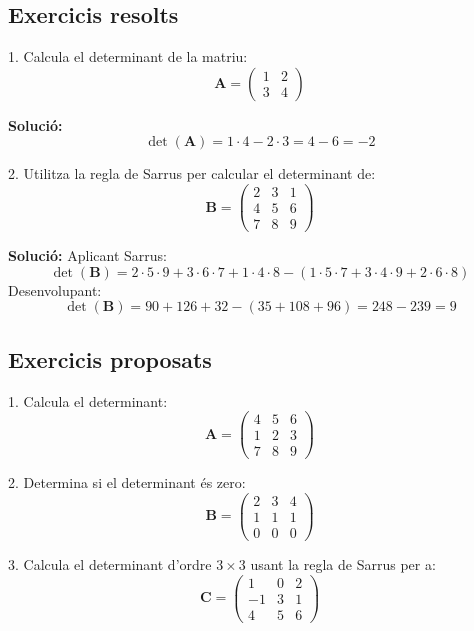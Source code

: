 \documentclass[12pt]{article}
\newcommand{\mat}[1]{\mathbf{#1}}
\begin{document}
\subsection*{Exercicis resolts}
\begin{exercici}
1. Calcula el determinant de la matriu:
\[
\mat{A} = \begin{pmatrix}
1 & 2 \\
3 & 4
\end{pmatrix}
\]

\textbf{Solució:}
\[
\det(\mat{A}) = 1\cdot4 - 2\cdot3 = 4 - 6 = -2
\]

2. Utilitza la regla de Sarrus per calcular el determinant de:
\[
\mat{B} = \begin{pmatrix}
2 & 3 & 1 \\
4 & 5 & 6 \\
7 & 8 & 9
\end{pmatrix}
\]

\textbf{Solució:} Aplicant Sarrus:
\[
\det(\mat{B}) = 2\cdot5\cdot9 + 3\cdot6\cdot7 + 1\cdot4\cdot8 
- (1\cdot5\cdot7 + 3\cdot4\cdot9 + 2\cdot6\cdot8)
\]
Desenvolupant:
\[
\det(\mat{B}) = 90 + 126 + 32 - (35 + 108 + 96) = 248 - 239 = 9
\]
\end{exercici}

\subsection*{Exercicis proposats}
\begin{exercici}
1. Calcula el determinant:
\[
\mat{A} = \begin{pmatrix}
4 & 5 & 6 \\
1 & 2 & 3 \\
7 & 8 & 9
\end{pmatrix}
\]

2. Determina si el determinant és zero:
\[
\mat{B} = \begin{pmatrix}
2 & 3 & 4 \\
1 & 1 & 1 \\
0 & 0 & 0
\end{pmatrix}
\]

3. Calcula el determinant d'ordre $3 \times 3$ usant la regla de Sarrus per a:
\[
\mat{C} = \begin{pmatrix}
1 & 0 & 2 \\
-1 & 3 & 1 \\
4 & 5 & 6
\end{pmatrix}
\]
\end{exercici}
\end{document}
